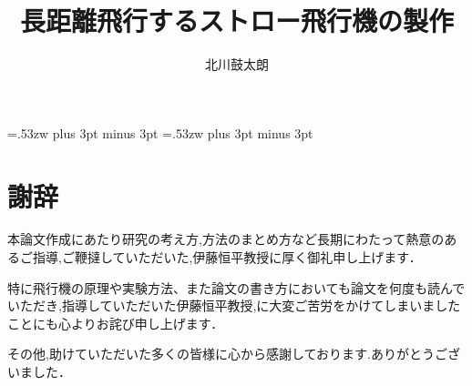 \documentclass[12pt,oneside]{paper}
\title{長距離飛行するストロー飛行機の製作}
\author{北川鼓太朗}
\begin{document}
\setlength{\baselineskip}{9truemm}

\kanjiskip=.53zw plus 3pt minus 3pt
\xkanjiskip=.53zw plus 3pt minus 3pt

\tableofcontents















\chapter*{謝辞}
本論文作成にあたり研究の考え方,方法のまとめ方など長期にわたって熱意のあるご指導,ご鞭撻していただいた,伊藤恒平教授に厚く御礼申し上げます．

特に飛行機の原理や実験方法、また論文の書き方においても論文を何度も読んでいただき,指導していただいた伊藤恒平教授,に大変ご苦労をかけてしまいましたことにも心よりお詫び申し上げます．

その他,助けていただいた多くの皆様に心から感謝しております.ありがとうございました．
\end{document}
